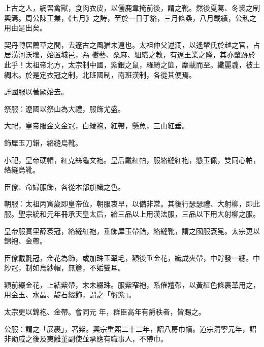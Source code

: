 
\begin{pinyinscope}

 上古之人，網罟禽獸，食肉衣皮，以儷鹿韋掩前後，謂之靴。然後夏葛、冬裘之制興焉。周公陳王業，《七月》之詩，至於一日于貉，三月條桑，八月載績，公私之用由是出矣。



 契丹轉居薦草之間，去邃古之風猶未遠也。太祖仲父述瀾，以遙輦氏於越之官，占居潢河沃壤，始置城邑，為
 樹藝、桑麻、組織之教，有遼王業之隆，其亦肇跡於此乎！太祖帝北方，太宗制中國，紫銀之鼠，羅綺之篚，麇載而至。纖麗毳，被土綢木。於是定衣冠之制，北班國制，南班漢制，各從其便焉。



 詳國服以著厥始去。



 祭服：遼國以祭山為大禮，服飾尤盛。



 大祀，皇帝服金文金冠，白綾袍，紅帶，懸魚，三山紅垂。



 飾犀玉刀錯，絡縫烏靴。



 小祀，皇帝硬帽，紅克絲龜文袍。皇后戴紅帕，服絡縫紅袍，懸玉佩，雙同心帕，絡縫烏靴。



 臣僚、命婦服飾，各從本部旗幟之色。



 朝服：太祖丙寅歲即皇帝位，朝服衷早，以備非常。其後行瑟瑟禮、大射柳，即此服。聖宗統和元年冊承天皇太后，給三品以上用漢法服，三品以下用大射柳之服。



 皇帝服實里薛袞冠，絡縫紅袍，垂飾犀玉帶錯，絡縫靴，謂之國服袞冕。太宗更以錦袍、金帶。



 臣僚戴氈冠，金花為飾，或加珠玉翠毛，額後垂金花，織成夾帶，中貯發一總。中紗冠，制如烏紗帽，無簷，不姤雙耳。



 額前綴金花，上結紫帶，末未綴珠。服紫窄袍，系傕羶帶，以黃紅色條裹革用之，用金玉、水晶、靛石綴飾，謂之「盤紫」。



 太宗更以錦袍、金帶。會同元
 年，群臣高年有爵秩者，皆賜之。



 公服：謂之「展裹」，著紫。興宗重熙二十二年，詔八房巾幘。道宗清寧元年，詔非勛戚之後及夷離堇副使並承應有職事人，不帶巾。




\end{pinyinscope}
